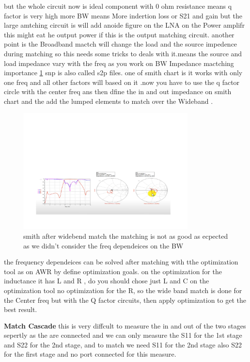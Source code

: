 \documentclass{article}
\begin{document}
\begin{itemize}
but the whole circuit now is ideal component with 0 ohm resistance means q factor is very high 
more BW means More indertion loss or S21  and gain but the large amtching circuit is will add anoide figure on the LNA 
on the  Power amplifr this might eat he output power if this is the output matching circuit.
another point is the Broadband mactch will change the load and the source impedence during matching so this needs some tricks to deals with it.means the source and load impedance vary with the freq as you work on BW 
Impedance mactching importance \cref{Anurug rf6_3}
snp is also called s2p files. 
one of smith chart is it works with  only one freq and all other factors will based on it .now you have to use the q factor circle with the center freq ans then dfine the in and out impedance on smith chart and the add the lumped elements to match over the Wideband . 


\begin{figure}[H]
    \centering
    \includegraphics[width=0.8\textwidth]{figures/Anurug rf6_3.pdf}
    \caption{smith after widebend match the matching is not as good as ecpected as we didn't consider the freq dependeices on the BW }
    \label{Anurug rf6_3}
\end{figure}
 

the frequency dependeices can be solved after matching with tthe optimization tool as on AWR by define optimization goals.
on the optimization for the inductance it has L and R , do  you should chose just L and C on the optimization tool no optimization for the R, so the wide band match is done for the Center freq but with the Q factor circuits, then apply optimization to get the best result.


\textbf{Match Cascade}
this is very diffcult to measure the in and out of the two stages sepertly as the are connected and we can only measure the  S11 for the 1st stage and S22 for the 2nd stage,
and to match we need S11 for the 2nd stage also S22 for the first stage and no port connected for this measure.


\end{itemize}
\end{document}

